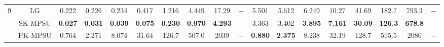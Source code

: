 \begin{table}[p]
\begin{adjustbox}{angle=90,center,scale=0.85}
\begin{tabular}{|c|c|c|c|c|c|c|c|c|c|c|c|c|c|c|c|c|c|}
\multirow{3}{*}{9}  
 & LG & \multicolumn{1}{c|}{0.222} & \multicolumn{1}{c|}{0.226} & \multicolumn{1}{c|}{0.234} & \multicolumn{1}{c|}{0.417} & \multicolumn{1}{c|}{1.216} & \multicolumn{1}{c|}{4.449} & \multicolumn{1}{c|}{17.29} & \multicolumn{1}{c|}{$-$} & \multicolumn{1}{c|}{5.501} & \multicolumn{1}{c|}{5.612} & \multicolumn{1}{c|}{6.249} & \multicolumn{1}{c|}{10.27} & \multicolumn{1}{c|}{41.69} & \multicolumn{1}{c|}{182.7} & \multicolumn{1}{c|}{793.3} & \multicolumn{1}{c|}{$-$} \\ \cline{2-18} 
 & SK-MPSU & \multicolumn{1}{c|}{\textbf{0.027}} & \multicolumn{1}{c|}{\textbf{0.031}} & \multicolumn{1}{c|}{\textbf{0.039}} & \multicolumn{1}{c|}{\textbf{0.075}} & \multicolumn{1}{c|}{\textbf{0.230}} & \multicolumn{1}{c|}{\textbf{0.970}} & \multicolumn{1}{c|}{\textbf{4.293}} & \multicolumn{1}{c|}{$-$} & \multicolumn{1}{c|}{3.363} & \multicolumn{1}{c|}{3.402} & \multicolumn{1}{c|}{\textbf{3.895}} & \multicolumn{1}{c|}{\textbf{7.161}} & \multicolumn{1}{c|}{\textbf{30.09}} & \multicolumn{1}{c|}{\textbf{126.3}} & \multicolumn{1}{c|}{\textbf{678.8}} & \multicolumn{1}{c|}{$-$} \\ \cline{2-18} 
 & PK-MPSU & \multicolumn{1}{c|}{0.764} & \multicolumn{1}{c|}{2.271} & \multicolumn{1}{c|}{8.074} & \multicolumn{1}{c|}{31.64} & \multicolumn{1}{c|}{126.7} & \multicolumn{1}{c|}{507.0} & \multicolumn{1}{c|}{2039} & \multicolumn{1}{c|}{$-$} & \multicolumn{1}{c|}{\textbf{0.880}} & \multicolumn{1}{c|}{\textbf{2.375}} & \multicolumn{1}{c|}{8.238} & \multicolumn{1}{c|}{32.19} & \multicolumn{1}{c|}{128.7} & \multicolumn{1}{c|}{515.5} & \multicolumn{1}{c|}{2080} & \multicolumn{1}{c|}{$-$} \\ \hline 


\end{tabular}
\end{adjustbox}
\end{table}
